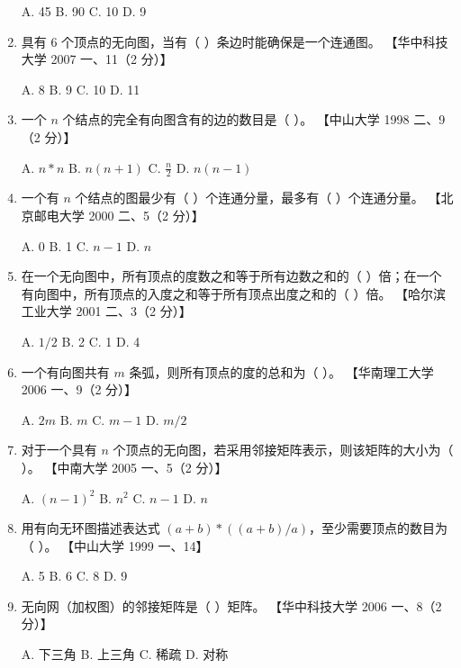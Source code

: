 \documentclass[lang=cn,newtx,10pt,scheme=chinese]{../../elegantbook}
\begin{document}
\begin{enumerate}
        A. 45 \quad B. 90 \quad C. 10 \quad D. 9  
    
        \item 具有 6 个顶点的无向图，当有（ ）条边时能确保是一个连通图。  
        【华中科技大学 2007 一、11（2 分）】  

        A. 8 \quad B. 9 \quad C. 10 \quad D. 11  
    
        \item 一个 $n$ 个结点的完全有向图含有的边的数目是（ ）。  
        【中山大学 1998 二、9（2 分）】 

        A. $n*n$ \quad B. $n(n+1)$ \quad C. $\frac{n}{2}$ \quad D. $n(n-1)$  
    
        \item 一个有 $n$ 个结点的图最少有（ ）个连通分量，最多有（ ）个连通分量。  
        【北京邮电大学 2000 二、5（2 分）】  

        A. 0 \quad B. 1 \quad C. $n-1$ \quad D. $n$  
    
        \item 在一个无向图中，所有顶点的度数之和等于所有边数之和的（ ）倍；在一个有向图中，所有顶点的入度之和等于所有顶点出度之和的（ ）倍。  
        【哈尔滨工业大学 2001 二、3（2 分）】 

        A. $1/2$ \quad B. 2 \quad C. 1 \quad D. 4  
    
        \item 一个有向图共有 $m$ 条弧，则所有顶点的度的总和为（ ）。  
        【华南理工大学 2006 一、9（2 分）】  

        A. $2m$ \quad B. $m$ \quad C. $m-1$ \quad D. $m/2$  
    
        \item 对于一个具有 $n$ 个顶点的无向图，若采用邻接矩阵表示，则该矩阵的大小为（ ）。  
        【中南大学 2005 一、5（2 分）】  

        A. $(n-1)^2$ \quad B. $n^2$ \quad C. $n-1$ \quad D. $n$  
    
        \item 用有向无环图描述表达式 $(a+b) \ast ((a+b)/a)$，至少需要顶点的数目为（ ）。  
        【中山大学 1999 一、14】  

        A. 5 \quad B. 6 \quad C. 8 \quad D. 9  
    
        \item 无向网（加权图）的邻接矩阵是（ ）矩阵。  
        【华中科技大学 2006 一、8（2 分）】  

        A. 下三角 \quad B. 上三角 \quad C. 稀疏 \quad D. 对称  
    

\end{enumerate}
\end{document}
